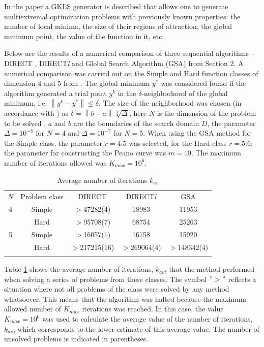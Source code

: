 \documentclass{svproc}
\begin{document}
In the paper \cite{Gaviano2003} a GKLS generator is described that allows one to generate multiextremal optimization problems with previously known properties: the number of local minima, the size of their regions of attraction, the global minimum point, the value of the function in it, etc.

Below are the results of a numerical comparison of three sequential algorithms -- DIRECT \cite{Jones2009}, DIRECT\textit{l} \cite{Gablonsky2001} and Global Search Algorithm (GSA) from Section 2.  A numerical comparison was carried out on the Simple and Hard function classes of dimension 4 and 5 from \cite{Gaviano2003}. The global minimum $y^*$ was considered found if the algorithm generated a trial point $y^k$ in the $\delta$-neighborhood of the global minimum, i.e. $\left\| {{y}^{k}}-{{y}^{*}} \right\| \leqslant \delta $.  The size of the neighborhood was chosen (in accordance with \cite{Sergeyev2006}) as $\delta =\left\| b-a \right\|\sqrt[N]{\Delta }$, here $N$ is the dimension of the problem to be solved , $a$ and $b$ are the boundaries  of the search domain $D$, the parameter  $\Delta ={{10}^{-6}}$ for $N=4$ and $\Delta ={{10}^{-7}}$ for $N=5$. When using the GSA method for the Simple class, the parameter $r=4.5$ was selected, for the Hard class $r=5.6$; the parameter for constructing the Peano curve was $m=10$. The maximum number of iterations allowed was $K_{max} = 10^6$.


\begin{table}[t]
	\caption{Average number of iterations $k_{av}$}\label{table:average_iters}
	\center
	\begin{tabular}{ccccc}
		\hline\noalign{\smallskip}
  	 $N$ & Problem class & DIRECT & DIRECT\textit{l} & GSA \\
		\noalign{\smallskip} \hline \noalign{\smallskip}
			4 &	Simple& $>$47282(4) &	18983 &	11953 \\
	      & Hard &	$>$95708(7) &	68754 &	25263 \\
		\noalign{\smallskip}
			5	& Simple &	$>$16057(1) &	16758 &	15920 \\
				& Hard &	$>$217215(16) &	$>$269064(4) & $>$148342(4) \\
		\noalign{\smallskip}\hline
	\end{tabular}
\end{table}


Table \ref{table:average_iters} shows the average number of iterations, $k_{av}$, that the method performed when solving a series of problems from these classes. The symbol \(">"\) reflects a situation where not all problems of the class were solved by any method whatsoever. This means that the algorithm was halted because the maximum allowed number of $K_{max}$ iterations was reached. In this case, the value $K_{max} = 10^6$ was used to calculate the average value of the number of iterations, $k_{av}$, which corresponds to the lower estimate of this average value. The number of unsolved problems is indicated in parentheses.
   
\end{document}
